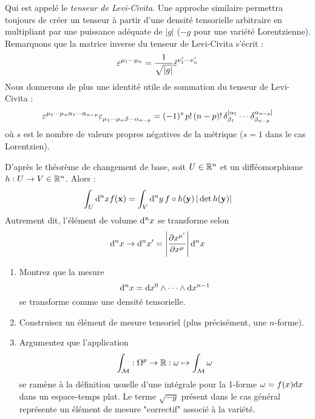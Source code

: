 Qui est appelé le \emph{tenseur de Levi-Civita}. Une approche similaire permettra toujours de créer un tenseur à partir d'une densité tensorielle arbitraire en multipliant par une puissance adéquate de $\lvert g \rvert$ ($-g$ pour une variété Lorentzienne). Remarquons que la matrice inverse du tenseur de Levi-Civita s'écrit :
\begin{equation}
    \varepsilon\indices{^{\mu_1} ^\cdots ^{\mu_n}} = \frac{1}{\sqrt{\lvert g\rvert}}\tilde{\varepsilon}\indices{^{\nu'_1}  ^\cdots ^{\nu'_n}}
\end{equation}
Nous donnerons de plus une identité utile de sommation du tenseur de Levi-Civita :
\begin{equation}
    \varepsilon\indices{^{\mu_1} ^\cdots ^{\mu_n} ^{\alpha_1} ^\cdots ^{\alpha_{n-p}}} \varepsilon\indices{_{\mu_1} _\cdots _{\mu_n} _{\beta} _\cdots _{\alpha_{n-p}}} = (-1)^s \, p! \, (n-p)! \,\delta^{[\alpha_1}_{\beta_1} \cdots \delta^{\alpha_{n-p}]}_{\beta_{n-p}}
\end{equation}
où $s$ est le nombre de valeurs propres négatives de la métrique ($s=1$ dans le cas Lorentzien).
\begin{exerc}
    D'après le théorème de changement de base, soit $U \in\mathbb{R}^n$ et un difféomorphisme $h:U \to V \in \mathbb{R}^n$. Alors :
    \begin{equation*}
        \int_U \mathrm{d}^n x f(\bm{\mathrm{x}}) = \int_V \mathrm{d}^n y \, f \circ h (\bm{\mathrm{y}}) \, \vert \det h(\bm{\mathrm{y}})\vert
    \end{equation*}
    Autrement dit, l'élément de volume $\mathrm{d}^n x$ se transforme selon
    \begin{equation*}
        \mathrm{d}^n x \to \mathrm{d}^n x' = \left| \frac{\partial x^{\mu'}}{\partial x^\mu}\right| \mathrm{d}^n x
    \end{equation*}
    \begin{enumerate}
        \item Montrez que la mesure
        \begin{equation*}
            \mathrm{d}^n x = \mathrm{d} x^0 \wedge \cdots \wedge \mathrm{d} x^{n-1}
        \end{equation*}
        se transforme comme une densité tensorielle.
        \item Construisez un élément de mesure tensoriel (plus précisément, une $n$-forme).
        \item Argumentez que l'application
        \begin{equation}
            \int_\mathcal{M} : \Omega^p \to \mathbb{R} : \omega \mapsto \int_\mathcal{M} \omega
        \end{equation}
        se ramène à la définition usuelle d'une intégrale pour la 1-forme $\omega = f(x) \mathrm{d} x$ dans un espace-temps plat. Le terme $\sqrt{-g}$ présent dans le cas général représente un élément de mesure "correctif" associé à la variété.
    \end{enumerate}
\end{exerc}
